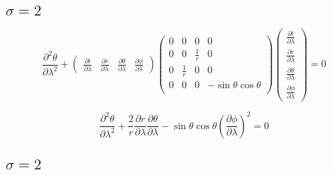\subsection*{$\sigma = 2$}

\begin{equation}
    \frac{\partial^2 \theta}{\partial \lambda^2} +
    \begin{pmatrix}
        \frac{\partial t}{\partial \lambda}      &
        \frac{\partial r}{\partial \lambda}      &
        \frac{\partial \theta}{\partial \lambda} &
        \frac{\partial \phi}{\partial \lambda}
    \end{pmatrix}
    \begin{pmatrix}
        0 & 0           & 0           & 0                     \\
        0 & 0           & \frac{1}{r} & 0                     \\
        0 & \frac{1}{r} & 0           & 0                     \\
        0 & 0           & 0           & -\sin\theta\cos\theta \\
    \end{pmatrix}
    \begin{pmatrix}
        \frac{\partial t}{\partial \lambda}      \\[6pt]
        \frac{\partial r}{\partial \lambda}      \\[6pt]
        \frac{\partial \theta}{\partial \lambda} \\[6pt]
        \frac{\partial \phi}{\partial \lambda}
    \end{pmatrix} = 0
\end{equation}

\begin{equation}
    \frac{\partial^2 \theta}{\partial \lambda^2} +
    \frac{2}{r} \frac{\partial r}{\partial \lambda}\frac{\partial \theta}{\partial \lambda} -
    \sin\theta\cos\theta \left(\frac{\partial \phi}{\partial \lambda}\right)^2 = 0
\end{equation}

\subsection*{$\sigma = 2$}

